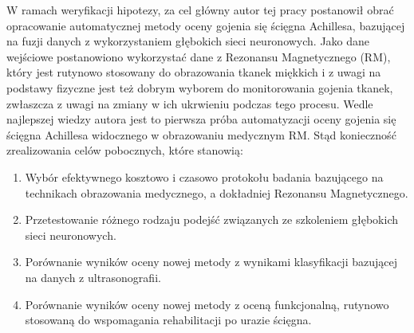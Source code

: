 W ramach weryfikacji hipotezy, za cel główny autor tej pracy postanowił obrać opracowanie automatycznej metody oceny gojenia się ścięgna Achillesa, bazującej na fuzji danych z wykorzystaniem głębokich sieci neuronowych. Jako dane wejściowe postanowiono wykorzystać dane z Rezonansu Magnetycznego (RM), który jest rutynowo stosowany do obrazowania tkanek miękkich i z uwagi na podstawy fizyczne jest też dobrym wyborem do monitorowania gojenia tkanek, zwłaszcza z uwagi na zmiany w ich ukrwieniu podczas tego procesu. Wedle najlepszej wiedzy autora jest to pierwsza próba automatyzacji oceny gojenia się ścięgna Achillesa widocznego w obrazowaniu medycznym RM. Stąd konieczność zrealizowania celów pobocznych, które stanowią:
\begin{enumerate}
	\item Wybór efektywnego kosztowo i czasowo protokołu badania bazującego na technikach obrazowania medycznego, a dokładniej Rezonansu Magnetycznego.
	\item Przetestowanie różnego rodzaju podejść związanych ze szkoleniem głębokich sieci neuronowych.
	\item Porównanie wyników oceny nowej metody z wynikami klasyfikacji bazującej na danych z ultrasonografii.
	\item Porównanie wyników oceny nowej metody z oceną funkcjonalną, rutynowo stosowaną do wspomagania rehabilitacji po urazie ścięgna.
\end{enumerate}

